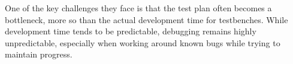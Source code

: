 \documentclass[12pt]{report}
\begin{document}
One of the key challenges they face is that the test plan often becomes a bottleneck, more so than the actual
development time for testbenches. While development time tends to be predictable, debugging remains highly
unpredictable, especially when working around known bugs while trying to maintain progress.

\begin{comment}
Company 1 develops ASICs for the hearing aid industry.
- 7-8 dedicated verification engineers

- don't use all UVM and SV features
- try to stick to standard features to make hiring easier
- develop all VIP inhouse
- reuse inhouse VIP across projects, e.g. interfaces like APB or SWD
- integrate C or verilog models for bought IP like EEPROM
- use VCS for simulation
- prefer single language for design to enable incremental compilation
- think that register abstraction in UVM is very complex
- have testbenches at the module level
- use randomized inputs (CRV)
- integrate matlab models for DSP
- Signal data streams are not random but represent typical data
- constraints in time, i.e. between signal packages, are difficult
- use FSM code coverage
- no line or branch coverage
- functional coverage

- after specification is finished, verification starts in parallel with design
- basic testbench layout can be created based on interfaces

- for debugging, assertion-based verification is used, some formal, some runtime, some both
- use connectivity checks to check that certain config connects certain parts of design

- for regression CI is used
- checkout always works
- 6000 simulations with tests
- 6 hours runtime
- synthesis is also done for regression
- coverage checks are performed

- no ISO standards have to be considered by the verification team
- standards are required for chip set, already captured in verification plan

- inhouse VIP is actively improved and maintained and reused
- 1 code base for everything

- have looked at PyUVM but speed is an issue
- want a setup framework to generate basic structure of testbench
- want a setup framework to generate basic unit test structure
- afraid of adapting new niche tools since it may be a recruitment issue

- in their experience it is rare that software engineers become verification engineers, don't see need to tailor verification environment to software engineers


\end{comment}
\end{document}
